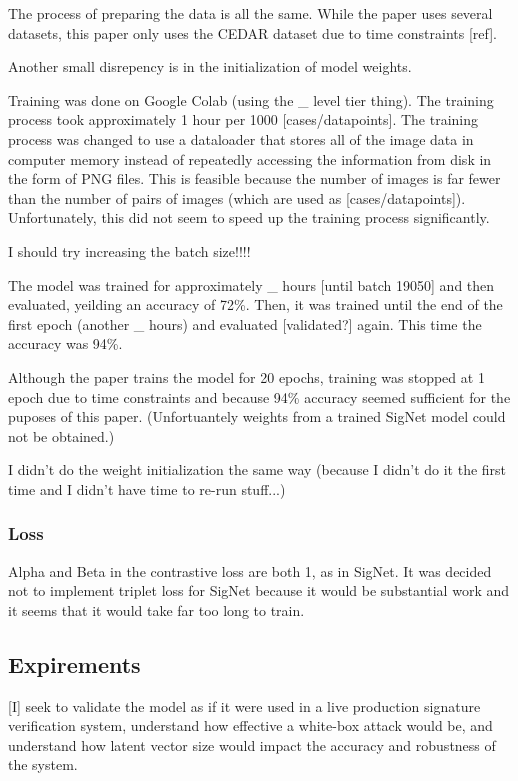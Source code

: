 The process of preparing the data is all the same.
While the paper uses several datasets, this paper only uses the CEDAR dataset due to time constraints [ref].

Another small disrepency is in the initialization of model weights.

Training was done on Google Colab (using the \_ level tier thing).
The training process took approximately 1 hour per 1000 [cases/datapoints].
The training process was changed to use a dataloader that stores all of the image data in computer memory instead of repeatedly accessing the information from disk in the form of PNG files.
This is feasible because the number of images is far fewer than the number of pairs of images (which are used as [cases/datapoints]).
Unfortunately, this did not seem to speed up the training process significantly.

I should try increasing the batch size!!!!

The model was trained for approximately \_ hours [until batch 19050] and then evaluated, yeilding an accuracy of 72\%.
Then, it was trained until the end of the first epoch (another \_ hours) and evaluated [validated?] again.
This time the accuracy was 94\%.

Although the paper trains the model for 20 epochs, training was stopped at 1 epoch due to time constraints and because 94\% accuracy seemed sufficient for the puposes of this paper.
(Unfortuantely weights from a trained SigNet model could not be obtained.)

I didn't do the weight initialization the same way (because I didn't do it the first time and I didn't have time to re-run stuff...)

\subsubsection{Loss}
Alpha and Beta in the contrastive loss are both 1, as in SigNet\cite{GitHub_sounakdey}.
It was decided not to implement triplet loss for SigNet because it would be substantial work and it seems that it would take far too long to train.


\subsection{Expirements}

[I] seek to validate the model as if it were used in a live production signature verification system, understand how effective a white-box attack would be, and understand how latent vector size would impact the accuracy and robustness of the system.

